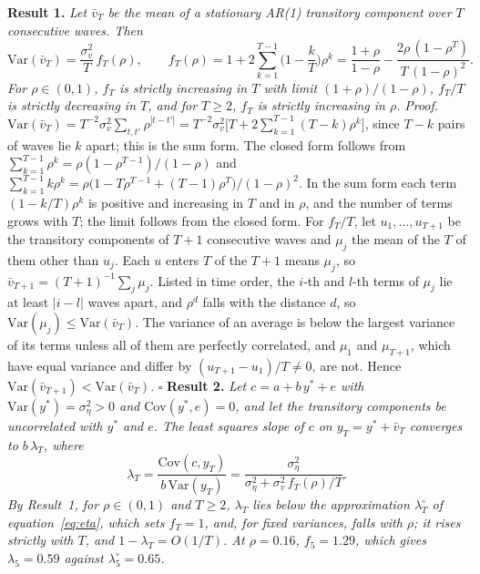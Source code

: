 \documentclass[11pt]{article}
\begin{document}
\noindent\textbf{Result 1.} \emph{Let $\bar v_{T}$ be the mean of a stationary AR(1) transitory component over $T$ consecutive waves. Then}
\begin{equation}
\mathrm{Var}(\bar v_{T}) = \frac{\sigma^2_v}{T}\, f_T(\rho), \qquad
f_T(\rho) = 1 + 2\sum_{k=1}^{T-1}\Big(1 - \frac{k}{T}\Big)\rho^{k}
= \frac{1+\rho}{1-\rho} - \frac{2\rho\,(1-\rho^{T})}{T\,(1-\rho)^{2}} .
\label{eq:app-fT}
\end{equation}
\emph{For $\rho \in (0,1)$, $f_T$ is strictly increasing in $T$ with limit $(1+\rho)/(1-\rho)$, $f_T/T$ is strictly decreasing in $T$, and for $T \ge 2$, $f_T$ is strictly increasing in $\rho$.}
\proofskip
\noindent\emph{Proof.} $\mathrm{Var}(\bar v_{T}) = T^{-2}\sigma^2_v\sum_{t,t'}\rho^{|t-t'|} = T^{-2}\sigma^2_v\big[T + 2\sum_{k=1}^{T-1}(T-k)\rho^{k}\big]$, since $T-k$ pairs of waves lie $k$ apart; this is the sum form. The closed form follows from $\sum_{k=1}^{T-1}\rho^k = \rho(1-\rho^{T-1})/(1-\rho)$ and $\sum_{k=1}^{T-1}k\rho^k = \rho\big(1 - T\rho^{T-1} + (T-1)\rho^{T}\big)/(1-\rho)^2$. In the sum form each term $(1-k/T)\rho^k$ is positive and increasing in $T$ and in $\rho$, and the number of terms grows with $T$; the limit follows from the closed form.
\partskip
For $f_T/T$, let $u_1, \dots, u_{T+1}$ be the transitory components of $T+1$ consecutive waves and $\mu_j$ the mean of the $T$ of them other than $u_j$. Each $u$ enters $T$ of the $T+1$ means $\mu_j$, so $\bar v_{T+1} = (T+1)^{-1}\sum_j \mu_j$. Listed in time order, the $i$-th and $l$-th terms of $\mu_j$ lie at least $|i-l|$ waves apart, and $\rho^{d}$ falls with the distance $d$, so $\mathrm{Var}(\mu_j) \le \mathrm{Var}(\bar v_T)$. The variance of an average is below the largest variance of its terms unless all of them are perfectly correlated, and $\mu_1$ and $\mu_{T+1}$, which have equal variance and differ by $(u_{T+1} - u_1)/T \ne 0$, are not. Hence $\mathrm{Var}(\bar v_{T+1}) < \mathrm{Var}(\bar v_T)$. \hfill$\square$
\resultskip
\noindent\textbf{Result 2.} \emph{Let $c = a + b\,y^* + e$ with $\mathrm{Var}(y^*) = \sigma^2_\eta > 0$ and $\mathrm{Cov}(y^*, e) = 0$, and let the transitory components be uncorrelated with $y^*$ and $e$. The least squares slope of $c$ on $y_T = y^* + \bar v_T$ converges to $b\,\lambda_T$, where}
\begin{equation}
\lambda_T = \frac{\mathrm{Cov}(c, y_T)}{b\,\mathrm{Var}(y_T)} = \frac{\sigma^2_\eta}{\sigma^2_\eta + \sigma^2_v\, f_T(\rho)/T} .
\label{eq:app-lambda}
\end{equation}
\emph{By Result~1, for $\rho \in (0,1)$ and $T \ge 2$, $\lambda_T$ lies below the approximation $\lambda^\circ_T$ of equation~\eqref{eq:eta}, which sets $f_T = 1$, and, for fixed variances, falls with $\rho$; it rises strictly with $T$, and $1 - \lambda_T = O(1/T)$. At $\rho = 0.16$, $f_5 = 1.29$, which gives $\lambda_5 = 0.59$ against $\lambda^\circ_5 = 0.65$.}
\end{document}
